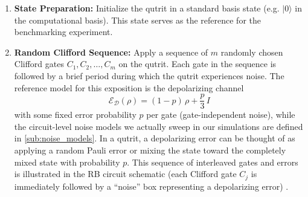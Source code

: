 \begin{enumerate}
    \item \textbf{State Preparation:} Initialize the qutrit in a standard basis state (e.g. $|0\rangle$ in the computational basis). This state serves as the reference for the benchmarking experiment.

    \item \textbf{Random Clifford Sequence:} Apply a sequence of $m$ randomly chosen Clifford gates $C_1, C_2, \dots, C_m$ on the qutrit. Each gate in the sequence is followed by a brief period during which the qutrit experiences noise. The reference model for this exposition is the depolarizing channel
    \begin{equation}
        \mathcal{E}_{\mathcal{D}}(\rho)= (1-p)\,\rho+\frac{p}{3}\,I
        \label{eq:1-depol}
    \end{equation}
    with some fixed error probability $p$ per gate (gate-independent noise), while the circuit-level noise models we actually sweep in our simulations are defined in \autoref{sub:noise_models}. In a qutrit, a depolarizing error can be thought of as applying a random Pauli error or mixing the state toward the completely mixed state with probability $p$. This sequence of interleaved gates and errors is illustrated in the RB circuit schematic (each Clifford gate $C_j$ is immediately followed by a “noise” box representing a depolarizing error) \cite{NielsenChuang2010,Emerson2005}. 
    

\end{enumerate}
